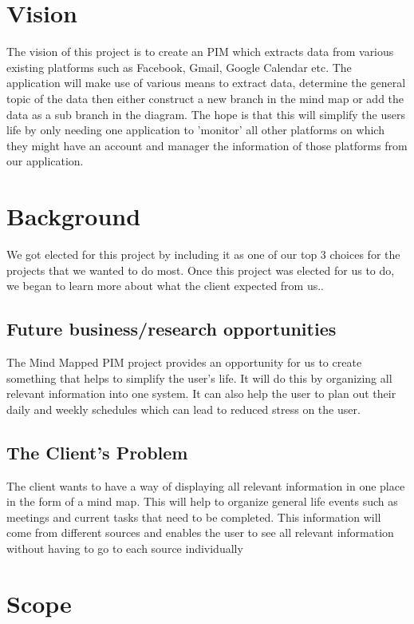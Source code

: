 \documentclass[hidelinks,english]{article}
\begin{document}
	
	\section{Vision}
	The vision of this project is to create an PIM which extracts data from various existing platforms such as Facebook, Gmail, Google Calendar etc. The application will make use of various means to extract data, determine the general topic of the data then either construct a new branch in the mind map or add the data as a sub branch in the diagram. The hope is that this will simplify the users life by only needing one application to 'monitor' all other platforms on which they might have an account and manager the information of those platforms from our application.
	
	\section{Background}
		We got elected for this project by including it as one of our top 3 choices for the projects that we wanted to do most. Once this project was elected for us to do, we began to learn more about what the client expected from us..

		\subsection{Future business/research opportunities}
		The Mind Mapped PIM project provides an opportunity for us to create something that helps to simplify the user's life. It will do this by organizing all relevant information into one system. It can also help the user to plan out their daily and weekly schedules which can lead to reduced stress on the user.
		
		\subsection{The Client's Problem}
		The client wants to have a way of displaying all relevant information in one place in the form of a mind map. This will help to organize general life events such as meetings and current tasks that need to be completed. This information will come from different sources and enables the user to see all relevant information without having to go to each source individually
		
	\section{Scope}
	
\end{document}
